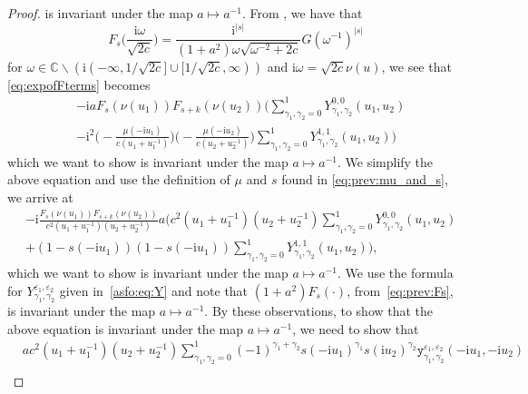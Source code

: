 \documentclass[11pt,twoside]{amsart}
\theoremstyle{plain}
\numberwithin{quest}{section}
\theoremstyle{remark}
\numberwithin{rem}{section}
\theoremstyle{definition}
\newcommand{\eps}{\varepsilon}
\begin{document}
\begin{proof}
		is invariant under the map $a \mapsto a^{-1}$.  From \cite[Lemma 2.2]{CJ16}, we have that
        $$F_s\bigg(\frac{\mathrm{i} \omega}{\sqrt{2c}}\bigg)=\frac{\mathrm{i}^{|s|}}{(1+a^2)\omega \sqrt{\omega^{-2}+2c}} G(\omega^{-1})^{|s|}$$ 
       for $\omega \in  \mathbb{C}\backslash (\mathrm{i}(-\infty,1/\sqrt{2c}] \cup [1/\sqrt{2c},\infty))$ and $\mathrm{i} \omega=\sqrt{2c} \nu(u)$, we see that \eqref{eq:expofFterms} becomes 
		\begin{equation*}
			\begin{split}
				&-\mathrm{i} a F_{s} (\nu (u_1)) F_{s+k} (\nu (u_2)) \Bigg( \sum_{\gamma_1, \gamma_2=0}^1 Y_{\gamma_1,\gamma_2}^{0,0}(u_1,u_2) \\& -\mathrm{i}^2 \Bigg( - \frac{\mu(-\mathrm{i} u_1)}{c(u_1+u_1^{-1})} \Bigg)\Bigg( - \frac{\mu(-\mathrm{i} u_2)}{c(u_2+u_2^{-1})} \Bigg) \sum_{\gamma_1, \gamma_2=0}^1 Y_{\gamma_1,\gamma_2}^{1,1}(u_1,u_2) \Bigg)
			\end{split}
		\end{equation*}
		which we want to show is invariant under the map $a \mapsto a^{-1}$.  We simplify the above equation and use the definition of $\mu$ and $s$ found in \eqref{eq:prev:mu_and_s}, we arrive at
		\begin{equation*}
			\begin{split}
				&-\mathrm{i} \frac{F_s (\nu (u_1)) F_{s+k} (\nu (u_2))}{c^2(u_1+u_1^{-1})(u_2+u_2^{-1}) } a \Bigg( c^2(u_1+u_1^{-1})(u_2+u_2^{-1}) \sum_{\gamma_1,\gamma_2=0}^1 Y_{\gamma_1,\gamma_2}^{0,0}( u_1,u_2) \\&+(1-s(-\mathrm{i}u_1))(1-s(-\mathrm{i}u_1))\sum_{\gamma_1,\gamma_2=0}^1 Y_{\gamma_1,\gamma_2}^{1,1}( u_1,u_2) \Bigg),
			\end{split}
		\end{equation*}
		which we want to show is invariant under the map $a\mapsto a^{-1}$.  We use the  formula for $Y_{\gamma_1,\gamma_2}^{\eps_1,\eps_2}$ given in~\eqref{asfo:eq:Y} and note that $(1+a^2)F_s(\cdot)$, from~\eqref{eq:prev:Fs}, is invariant under the map $a \mapsto a^{-1}$. By these observations, to show that the above equation is invariant under the map $a \mapsto a^{-1}$, we need to show that 
		\begin{equation}
			\begin{split}\label{lemproof:expheights:bigcoeffexp}
				&ac^2(u_1+u_1^{-1})(u_2+u_2^{-1}) \sum_{\gamma_1,\gamma_2=0}^1(-1)^{\gamma_1+\gamma_2} s(-\mathrm{i} u_1)^{\gamma_1}s(\mathrm{i}u_2)^{\gamma_2} \mathtt{y}_{\gamma_1,\gamma_2}^{\eps_1,\eps_2}(-\mathrm{i}u_1 ,- \mathrm{i} u_2)\\

\end{split}
\end{equation}
\end{proof}
\end{document}
